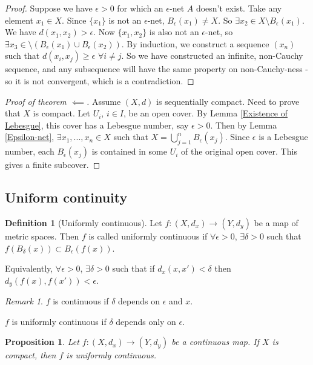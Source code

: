 \documentclass{article}
\theoremstyle{definition}
\newtheorem{defn}{Definition}[section]
\theoremstyle{plain}%
\newtheorem{prop}[thm]{Proposition}
\theoremstyle{remark}
\newtheorem*{rem}{Remark}
\newcommand{\union}{\cup}
\newcommand{\Union}{\bigcup}
\begin{document}
\begin{proof}
    Suppose we have $\epsilon > 0$ for which an $\epsilon$-net $A$ doesn't exist. Take any element $x_1 \in X$. Since $\{x_1\}$ is not an $\epsilon$-net, $B_\epsilon(x_1) \ne X$. So $\exists x_2 \in X \setminus B_\epsilon(x_1)$. We have $d(x_1, x_2) > \epsilon$. Now $\{x_1, x_2\}$ is also not an $\epsilon$-net, so $\exists x_3 \in  \setminus (B_\epsilon(x_1) \union B_\epsilon(x_2))$. By induction, we construct a sequence $(x_n)$ such that $d(x_i, x_j) \ge \epsilon$ $\forall i \ne j$. So we have constructed an infinite, non-Cauchy sequence, and any subsequence will have the same property on non-Cauchy-ness - so it is not convergent, which is a contradiction.
\end{proof}

\begin{proof}[Proof of theorem $\impliedby$]
    Assume $(X,d)$ is sequentially compact. Need to prove that $X$ is compact. Let $U_i$, $i \in I$, be an open cover. By Lemma \ref{Existence of Lebesgue}, this cover has a Lebesgue number, say $\epsilon > 0$. Then by Lemma \ref{Epsilon-net}, $\exists x_1, ..., x_n \in X$ such that $X = \Union_{j=1}^n B_\epsilon(x_j)$. Since $\epsilon$ is a Lebesgue number, each $B_\epsilon(x_j)$ is contained in some $U_i$ of the original open cover. This gives a finite subcover.
\end{proof}

\subsection{Uniform continuity}

\begin{defn}[Uniformly continuous]
    Let $f: (X, d_x) \to (Y, d_y)$ be a map of metric spaces. Then $f$ is called uniformly continuous if $\forall \epsilon > 0$, $\exists \delta > 0$ such that $f(B_{\delta}(x)) \subset B_\epsilon(f(x))$.
    
    Equivalently, $\forall \epsilon > 0$, $\exists \delta > 0$ such that if $d_x(x, x') < \delta$ then $d_y(f(x), f(x'))< \epsilon$.
\end{defn}

\begin{rem}
    $f$ is continuous if $\delta$ depends on $\epsilon$ and $x$.
    
    $f$ is uniformly continuous if $\delta$ depends only on $\epsilon$.
\end{rem}

\begin{prop}
    Let $f: (X, d_x) \to (Y, d_y)$ be a continuous map. If $X$ is compact, then $f$ is uniformly continuous.
\end{prop}
\end{document}
